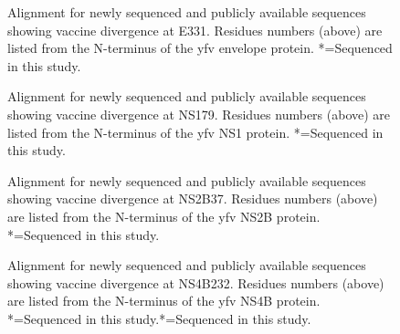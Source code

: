 \begin{figure}[h]
	
	\caption[Alignment for newly sequenced and publicly available sequences showing vaccine divergence at E331.]{Alignment for newly sequenced and publicly available sequences showing vaccine divergence at E331. Residues numbers (above) are listed from the N-terminus of the \gls{yfv} envelope protein. *=Sequenced in this study.}
	\label{alignment_E331}
\end{figure}
\clearpage

\begin{figure}[h]
	
	\caption[Alignment for newly sequenced and publicly available sequences showing vaccine divergence at NS179.]{Alignment for newly sequenced and publicly available sequences showing vaccine divergence at NS179. Residues numbers (above) are listed from the N-terminus of the \gls{yfv} NS1 protein. *=Sequenced in this study.}
	\label{alignment_NS179}
\end{figure}
\clearpage

\begin{figure}[h]
	
	\caption[Alignment for newly sequenced and publicly available sequences showing vaccine divergence at NS2B37.]{Alignment for newly sequenced and publicly available sequences showing vaccine divergence at NS2B37. Residues numbers (above) are listed from the N-terminus of the \gls{yfv} NS2B protein. *=Sequenced in this study.}
	\label{alignment_NS2B37}
\end{figure}
\clearpage

\begin{figure}[h]
	
	\caption[Alignment for newly sequenced and publicly available sequences showing vaccine divergence at NS4B232.]{Alignment for newly sequenced and publicly available sequences showing vaccine divergence at NS4B232. Residues numbers (above) are listed from the N-terminus of the \gls{yfv} NS4B protein. *=Sequenced in this study.*=Sequenced in this study.}
	\label{alignment_NS4B232}
\end{figure}
\clearpage

